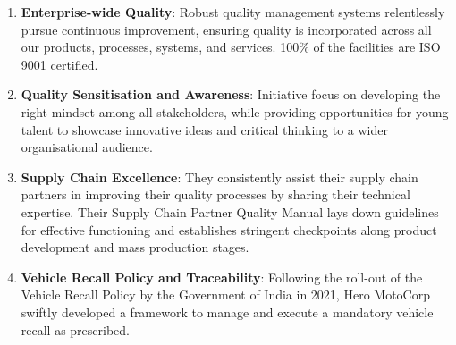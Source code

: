 \begin{enumerate}
	
\item \textbf{Enterprise-wide Quality}: Robust quality management systems relentlessly pursue continuous improvement, ensuring quality is incorporated across all our products, processes, systems, and services.
100\% of the facilities are ISO 9001 certified.\\
\item \textbf{Quality Sensitisation and Awareness}: Initiative focus
on developing the right mindset among all stakeholders, while
providing opportunities for young talent to showcase innovative
ideas and critical thinking to a wider organisational audience.\\
\item \textbf{Supply Chain Excellence}: They consistently assist their supply chain partners in improving their quality processes by sharing their technical expertise. Their Supply Chain Partner Quality Manual lays down guidelines for effective functioning and establishes stringent checkpoints along	product development and mass production stages.
\item \textbf{Vehicle Recall Policy and Traceability}: Following the roll-out of the Vehicle Recall Policy by the
Government of India in 2021, Hero MotoCorp swiftly
developed a framework to manage and execute a mandatory
vehicle recall as prescribed.

\end{enumerate}
